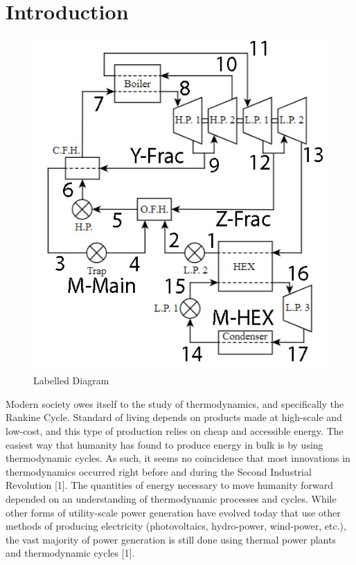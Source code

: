 \documentclass[10pt,cleanfoot]{asme2ej}
\begin{document}
\section{Introduction}

\begin{figure} 
\centerline{\includegraphics[width=4.5in]{figure/labels.jpg}}
\caption{Labelled Diagram}
\label{labels.jpg}
\end{figure}

Modern society owes itself to the study of thermodynamics, and specifically the Rankine Cycle. Standard of living depends on products made at high-scale and low-cost, and this type of production relies on cheap and accessible energy. The easiest way that humanity has found to produce energy in bulk is by using thermodynamic cycles. As such, it seems no coincidence that most innovations in thermodynamics occurred right before and during the Second Industrial Revolution [1]. The quantities of energy necessary to move humanity forward depended on an understanding of thermodynamic processes and cycles. While other forms of utility-scale power generation have evolved today that use other methods of producing electricity (photovoltaics, hydro-power, wind-power, etc.), the vast majority of power generation is still done using thermal power plants and thermodynamic cycles [1].
\end{document}
